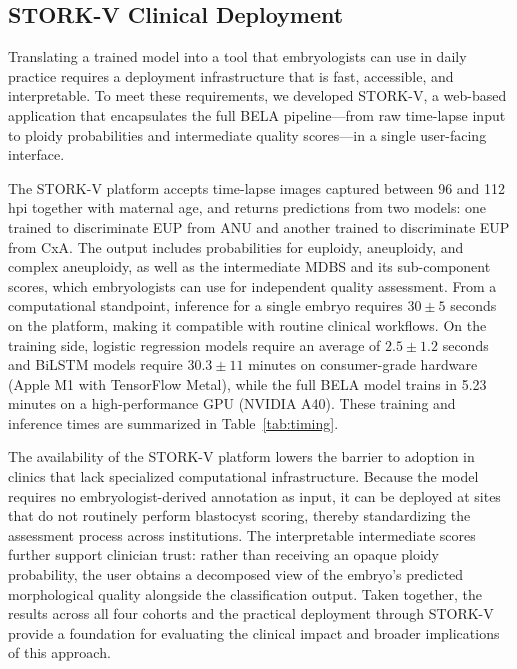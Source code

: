 \documentclass[11pt]{article}
\begin{document}
\subsection{STORK-V Clinical Deployment}

Translating a trained model into a tool that embryologists can use in daily practice requires a deployment infrastructure that is fast, accessible, and interpretable. To meet these requirements, we developed STORK-V, a web-based application that encapsulates the full BELA pipeline---from raw time-lapse input to ploidy probabilities and intermediate quality scores---in a single user-facing interface.

The STORK-V platform accepts time-lapse images captured between 96 and 112 hpi together with maternal age, and returns predictions from two models: one trained to discriminate EUP from ANU and another trained to discriminate EUP from CxA. The output includes probabilities for euploidy, aneuploidy, and complex aneuploidy, as well as the intermediate MDBS and its sub-component scores, which embryologists can use for independent quality assessment. From a computational standpoint, inference for a single embryo requires $30 \pm 5$ seconds on the platform, making it compatible with routine clinical workflows. On the training side, logistic regression models require an average of $2.5 \pm 1.2$ seconds and BiLSTM models require $30.3 \pm 11$ minutes on consumer-grade hardware (Apple M1 with TensorFlow Metal), while the full BELA model trains in 5.23 minutes on a high-performance GPU (NVIDIA A40). These training and inference times are summarized in Table~\ref{tab:timing}.

The availability of the STORK-V platform lowers the barrier to adoption in clinics that lack specialized computational infrastructure. Because the model requires no embryologist-derived annotation as input, it can be deployed at sites that do not routinely perform blastocyst scoring, thereby standardizing the assessment process across institutions. The interpretable intermediate scores further support clinician trust: rather than receiving an opaque ploidy probability, the user obtains a decomposed view of the embryo's predicted morphological quality alongside the classification output. Taken together, the results across all four cohorts and the practical deployment through STORK-V provide a foundation for evaluating the clinical impact and broader implications of this approach.
\end{document}
